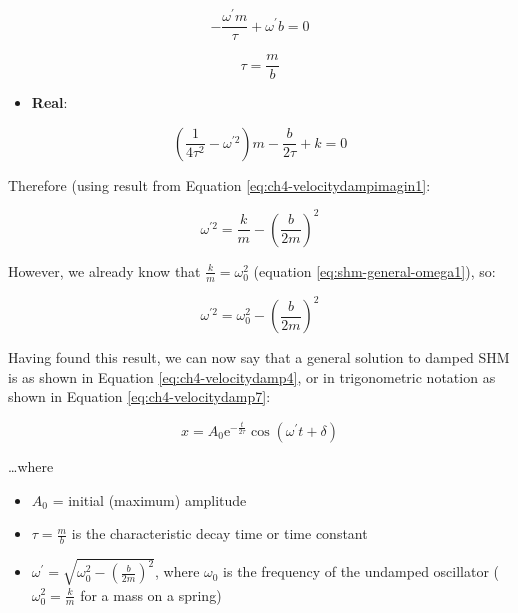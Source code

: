 \documentclass[
]{book}
\providecommand{\tightlist}{%
  \setlength{\itemsep}{0pt}\setlength{\parskip}{0pt}}
\begin{document}
\begin{equation}
-\frac{\omega^\prime m}{\tau} + \omega^\prime b = 0
\end{equation}

\begin{equation}
\tau = \frac{m}{b}
\label{eq:ch4-velocitydampimagin1}
\end{equation}

\begin{itemize}
\tightlist
\item
  \textbf{Real}:
\end{itemize}

\begin{equation}
\left( \frac{1}{4 \tau^2} - \omega^{\prime 2} \right) m - \frac{b}{2\tau} + k = 0
\end{equation}

Therefore (using result from Equation \eqref{eq:ch4-velocitydampimagin1}:

\begin{equation}
\omega^{\prime 2} = \frac{k}{m} - \left( \frac{b}{2m} \right)^2
\end{equation}

However, we already know that \(\frac{k}{m} = \omega_0^2\) (equation \eqref{eq:shm-general-omega1}), so:

\begin{equation}
\omega^{\prime 2} = \omega_0^2 - \left( \frac{b}{2m} \right)^2
\label{eq:ch4-veolocitydampreal1}
\end{equation}

Having found this result, we can now say that a general solution to damped SHM is as shown in Equation \eqref{eq:ch4-velocitydamp4}, or in trigonometric notation as shown in Equation \eqref{eq:ch4-velocitydamp7}:

\begin{equation}
x = A_0 \mathrm{e}^{-\frac{t}{2\tau}} \cos(\omega^\prime t + \delta)
 \label{eq:ch4-velocitydamp7}
\end{equation}

\ldots where

\begin{itemize}
\tightlist
\item
  \(A_0\) = initial (maximum) amplitude
\item
  \(\tau = \frac{m}{b}\) is the characteristic decay time or time constant
\item
  \(\omega^\prime = \sqrt{\omega_0^2 - \left(\frac{b}{2m}\right)^2}\), where \(\omega_0\) is the frequency of the undamped oscillator ( \(\omega_0^2 = \frac{k}{m}\) for a mass on a spring)
\end{itemize}
\end{document}
